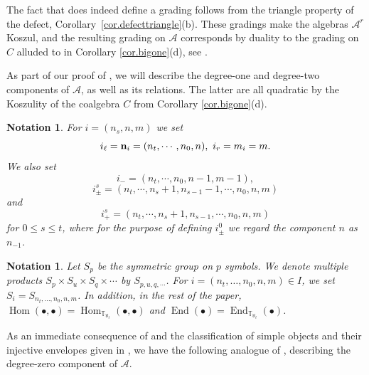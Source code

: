 \documentclass[11pt]{article}
\theoremstyle{plain}
\theoremstyle{nonumberplain}
\theoremstyle{plain}
\newtheorem{notation}[lemma]{Notation}
\theoremstyle{nonumberplain}
\newcommand\bT{\mathbb T}
\newcommand\cA{\mathcal A}
\DeclareMathOperator{\End}{\mathrm{End}}
\DeclareMathOperator{\Hom}{\mathrm{Hom}}
\begin{document}
  The fact that  does indeed define a grading
  follows from the triangle property of the defect, Corollary~\ref{cor.defecttriangle}(b).
  These gradings make the algebras $\cA^r$ Koszul, and the resulting
  grading on $\cA$ corresponds by duality to the grading on $C$ alluded to in
  Corollary \ref{cor.bigone}(d), see .



As part of our proof of , we will describe the
degree-one and degree-two components of $\cA$, as well as its
relations.  The latter are all quadratic by the Koszulity of the coalgebra $C$ from Corollary \ref{cor.bigone}(d).
 
\begin{notation}\label{not.indx}
  For $i=(n_s,n,m)$ we set 
  \begin{equation*}
    i_\ell = {\bf n}_i = (n_t,\cdots,n_0,n),\ i_r = m_i = m.
  \end{equation*}
We also set 
\begin{equation*}
  i_- = (n_t,\cdots,n_0,n-1,m-1),
\end{equation*}
\begin{equation*}
  i^s_{\pm}  = (n_t,\cdots, n_{s}+1,n_{s-1}-1,\cdots, n_0,n,m)
\end{equation*}
and 
\begin{equation*}
  i^s_+  = (n_t,\cdots, n_{s}+1,n_{s-1},\cdots, n_{0},n,m)
\end{equation*}
for $0\le s\le t$, where for the purpose of defining $i^0_{\pm}$ we
regard the component $n$ as $n_{-1}$.
\end{notation}


\begin{notation}\label{not.sym}
Let $S_p$ be the symmetric group on $p$ symbols. We denote multiple products $S_p\times S_u\times S_q\times\cdots$ by
$S_{p,u,q,\cdots}$.  For $i=\left(n_t,\ldots,n_0,n,m\right)\in I$, we set $S_{i}=S_{n_t,\ldots,n_0,n,m}$.  In addition, in the rest of the paper, $\Hom(\bullet,\bullet)=\Hom_{\bT_{\aleph_t}}(\bullet,\bullet)$ and $\End(\bullet)=\End_{\bT_{\aleph_t}}(\bullet)$.
\end{notation}


As an immediate consequence of  and the
classification of simple objects and their injective envelopes given
in , we have the following analogue of
\cite[Lemma 3.22]{us2}, describing the degree-zero component
of $\cA$.
\end{document}
